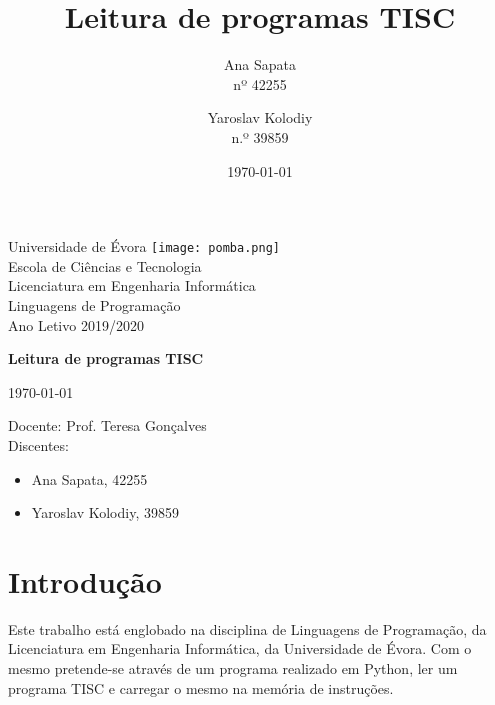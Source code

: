 \documentclass[titlepage,11pt,svgnames]{article}   %
\title{Leitura de programas TISC}
\author{Ana Sapata\\nº 42255 \and Yaroslav Kolodiy\\n.º 39859}
\date{\today}
\begin{document}
\begin{titlepage}
    \setlength{\parindent}{0pt}
    \vspace*{-3.8\baselineskip}
    Universidade de Évora \hfill \texttt{[image: pomba.png]} \\ 
    Escola de Ciências e Tecnologia \\ 
    Licenciatura em Engenharia Informática \\ 
    Linguagens de Programação \\
    Ano Letivo 2019/2020 
    
\noindent\makebox[\linewidth]{\rule{16cm}{0.4pt}}
    \begin{center}
    \vspace{.39\textheight}
    {\huge\bfseries \color{DarkBlue} Leitura de programas TISC \par}
    \bigbreak
    \today
	\end{center}
    \vspace*{16\baselineskip}
   	\hspace*{10cm}
	Docente: Prof. Teresa Gonçalves\\ 
	\hspace*{10cm}	
	Discentes:    
    \begin{itemize}
    \addtolength{\itemindent}{10cm}
    \item Ana Sapata, 42255
    \item Yaroslav Kolodiy, 39859
    \end{itemize}

\end{titlepage}


\hypersetup{linkcolor=black}
\tableofcontents
\pagebreak


\section{Introdução}
\label{sec:intro}
Este trabalho está englobado na disciplina de Linguagens de Programação, da Licenciatura em Engenharia Informática, da Universidade de Évora.
Com o mesmo pretende-se através de um programa realizado em Python, ler um programa TISC e carregar o mesmo na memória de instruções.
\end{document}
